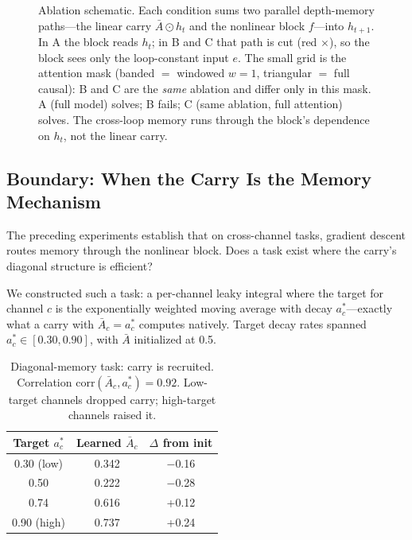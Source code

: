\documentclass[11pt]{article}
\begin{document}
\begin{figure}[ht]
{%
}
\caption{Ablation schematic. Each condition sums two parallel depth-memory paths---the linear carry $\bar{A} \odot h_t$ and the nonlinear block $f$---into $h_{t+1}$. In A the block reads $h_t$; in B and C that path is cut (red $\times$), so the block sees only the loop-constant input $e$. The small grid is the attention mask (banded $=$ windowed $w{=}1$, triangular $=$ full causal): B and C are the \emph{same} ablation and differ only in this mask. A (full model) solves; B fails; C (same ablation, full attention) solves. The cross-loop memory runs through the block's dependence on $h_t$, not the linear carry.}
\label{fig:ablation}
\end{figure}

\subsection{Boundary: When the Carry Is the Memory Mechanism}
\label{subsec:boundary}

The preceding experiments establish that on cross-channel tasks, gradient descent routes memory through the nonlinear block. Does a task exist where the carry's diagonal structure is efficient?

We constructed such a task: a per-channel leaky integral where the target for channel $c$ is the exponentially weighted moving average with decay $a^*_c$---exactly what a carry with $\bar{A}_c = a^*_c$ computes natively. Target decay rates spanned $a^*_c \in [0.30, 0.90]$, with $\bar{A}$ initialized at 0.5.

\begin{table}[ht]
\centering
\begin{tabular}{@{}ccc@{}}
\toprule
Target $a^*_c$ & Learned $\bar{A}_c$ & $\Delta$ from init \\
\midrule
0.30 (low) & 0.342 & $-$0.16 \\
0.50 & 0.222 & $-$0.28 \\
0.74 & 0.616 & +0.12 \\
0.90 (high) & 0.737 & +0.24 \\
\bottomrule
\end{tabular}
\caption{Diagonal-memory task: carry is recruited. Correlation $\text{corr}(\bar{A}_c, a^*_c) = 0.92$. Low-target channels dropped carry; high-target channels raised it.}
\label{tab:diagonal-memory}
\end{table}
\end{document}

